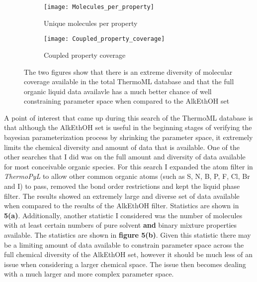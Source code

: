 \documentclass[rmp,nofootinbib,superscriptaddress,12pt,tightenlines,notitlepage]{revtex4-1}
\begin{document}
\begin{figure}[h!]
\centering
\begin{subfigure}{.5\textwidth}
  \centering
  \texttt{[image: Molecules\_per\_property]}
  \caption{Unique molecules per property}
  \label{fig:sub1}
\end{subfigure}%
\begin{subfigure}{.5\textwidth}
  \centering
  \texttt{[image: Coupled\_property\_coverage]}
  \caption{Coupled property coverage}
  \label{fig:sub2}
\end{subfigure}
\caption{The two figures show that there is an extreme diversity of molecular coverage available in the total ThermoML database and that the full organic liquid data availavle has a much better chance of well constraining parameter space when compared to the AlkEthOH set}
\label{fig:test}
\end{figure}
A point of interest that came up during this search of the ThermoML database is that although the AlkEthOH set is useful in the beginning stages
of verifying the bayesian parameterization process by shrinking the parameter space, it extremely limits the chemical diversity and amount of 
data that is available. One of the other searches that I did was on the full amount and diversity of data available for most conceivable organic
species. For this search I expanded the atom filter in \textit{ThermoPyL} to allow other common organic atoms (such as S, N, B, P, F, Cl, Br and I) to
pass, removed the bond order restrictions and kept the liquid phase filter. The results showed an extremely large and diverse set of data available when
compared to the results of the AlkEthOH filter. Statistics are shown in \textbf{5(a)}. Additionally, another statistic I considered was the number 
of molecules with at least certain numbers of pure solvent \textbf{and} binary mixture properties available. The statistics are shown in \textbf{figure 5(b)}. 
Given this statistic there may be a limiting amount of data available to constrain parameter space across the full chemical diversity of the AlkEthOH set, 
however it should be much less of an issue when considering a larger chemical space. The issue then becomes dealing with a much larger and more 
complex parameter space.
\end{document}
